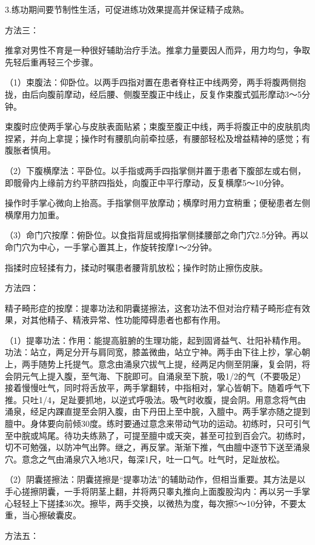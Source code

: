 \documentclass[12pt,UTF8,openany]{ctexbook}
\begin{document}
3.练功期间要节制性生活，可促进练功效果提高并保证精子成熟。

方法三：

推拿对男性不育是一种很好辅助治疗手法。推拿力量要因人而异，用力均匀，争取先轻后重再轻三个步骤。

（1）束腹法：仰卧位。以两手四指对置在患者脊柱正中线两旁，两手将腹两侧抱拢，由后向腹前摩动，经后腰、侧腹至腹正中线止，反复作束腹式弧形摩动3～5分钟。

束腹时应使两手掌心与皮肤表面贴紧；束腹至腹正中线，两手将腹正中的皮肤肌肉捏紧，并向上拿提；操作时有腰肌向前牵拉感，有腰部轻松及增益精神的感觉；有腹胀者慎用。

（2）下腹横摩法：平卧位。以手指或两手四指掌侧并置于患者下腹部左或右侧，即髋骨内上缘前方约平脐四指处，向腹正中平行摩动，反复横摩5～10分钟。

操作时手掌心微向上抬高。手指掌侧平放摩动；横摩时用力宜稍重；便秘患者左侧横摩用力加重。

（3）命门穴按摩：俯卧位。以食指背屈或拇指掌侧揉腰部之命门穴2.5分钟。再以命门穴为中心，一手掌心置其上，作旋转按摩1～2分钟。

指揉时应轻揉有力，揉动时嘱患者腰背肌放松；操作时防止擦伤皮肤。

方法四：

精子畸形症的按摩：提睾功法和阴囊搓擦法，这套功法不但对治疗精子畸形症有效果，对其他精子、精液异常、性功能障碍患者也都有作用。

（1）提睾功法：作用：能提高脏腑的生理功能，起到固肾益气、壮阳补精作用。功法：站立，两足分开与肩同宽，膝盖微曲，站立宁神。两手由下往上抄，掌心朝上，两手随势上托提气。意念由涌泉穴拔气上提，经两足内侧至阴廉，复会阴，将会阴元气上提入腹，至气海、下脘即可。自涌泉至下脘，吸1/2的气（不要吸足）接着慢慢吐气，同时将舌放平，两手掌翻转，中指相对，掌心皆朝下。随着呼气下推。只吐1/4，足趾要抓地，以逆式呼吸法。吸气时收腹，提会阴。用意念将气由涌泉，经足内踝直提至会阴入腹，由下丹田上至中脘，入膻中。两手掌亦随之提到膻中。身体要向前倾30度。练时要通过意念来带动气功的运动。初练时，只可引气至中脘或鸠尾。待功夫练熟了，可提至膻中或天突，甚至可拉到百会穴。初练时，切不可勉强，以防冲气出弊。继之，再反掌。渐渐下推，气由膻中逐节下送至涌泉穴。意念之气由涌泉穴入地3尺，每深1尺，吐一口气。吐气时，足趾放松。

（2）阴囊搓擦法：阴囊搓擦是“提睾功法”的辅助动作，但相当重要。其方法是以手心搓擦阴囊，一手将阴茎上翻，并将两只睾丸推向上面腹股沟内：再以另一手掌心轻轻上下搓揉36次。擦毕，两手交换，以微热为度，每次擦5～10分钟，不要太重，当心擦破囊皮。

方法五：
\end{document}
